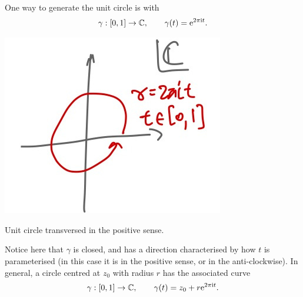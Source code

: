 \documentclass[letter-paper]{tufte-book}
\newenvironment{example}[1][Example]{\begin{trivlist}
\item[\hskip \labelsep {\bfseries #1}]}{\end{trivlist}}
\newcommand{\ex}{\mathrm{e}}
\newcommand{\zi}{{\rm i}}
\begin{document}
\begin{example}
  One way to generate the unit circle is with
  \begin{equation*}
    \gamma : [0, 1] \to \mathbb{C}, \qquad \gamma(t) = \ex^{2\pi \zi t}.
  \end{equation*}
  \begin{marginfigure}
    \includegraphics{comp_unit_circle}
    \caption{Unit circle transversed in the positive sense.}
  \end{marginfigure}
  Notice here that $\gamma$ is closed, and has a direction characterised by how
  $t$ is parameterised (in this case it is in the positive sense, or in the
  anti-clockwise). In general, a circle centred at $z_0$ with radius $r$ has the
  associated curve
  \begin{equation*}
    \gamma : [0, 1] \to \mathbb{C}, \qquad \gamma(t) = z_0 + r \ex^{2\pi \zi t}.
  \end{equation*}
\end{example}
\end{document}
